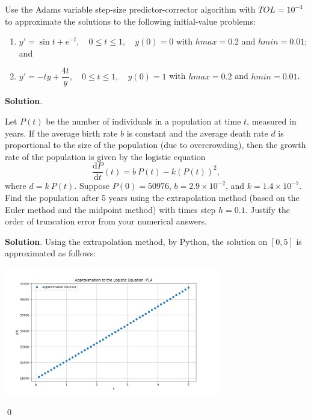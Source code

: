 \documentclass[11pt]{article}
\theoremstyle{break}
\newcommand{\dd}{\text{d}}
\numberwithin{equation}{theorem}
\begin{document}
\newpage
\begin{problem}\label{problem 13} %
    Use the Adams variable step-size predictor-corrector algorithm with $TOL = 10^{-4}$ to approximate the solutions to the following initial-value problems:
    \begin{enumerate}
        \item $y'=\sin t+e^{-t}, \quad 0\leq t\leq 1, \quad y(0)=0$ with $hmax=0.2$ and $hmin=0.01$; and
        \item $y'=-ty+\dfrac{4t}{y}, \quad 0\leq t\leq 1, \quad y(0)=1$ with $hmax=0.2$ and $hmin=0.01$.
    \end{enumerate}
\end{problem}
\textbf{Solution}. 


\newpage
\begin{problem}\label{problem 14} %
    Let $P(t)$ be the number of individuals in a population at time $t$, measured in years. If the average birth rate $b$ is constant and the average death rate $d$ is proportional to the size of the population (due to overcrowding), then the growth rate of the population is given by the logistic equation $$\dfrac{\dd P}{\dd t}(t)=b\:P(t)-k(P(t))^2,$$ where $d=k\:P(t)$. Suppose $P(0)=50976$, $b=2.9\times10^{-2}$, and $k=1.4\times 10^{-7}$. Find the population after 5 years using the extrapolation method (based on the Euler method and the midpoint method) with times step $h=0.1$. Justify the order of truncation error from your numerical answers.
\end{problem}
\textbf{Solution}. Using the extrapolation method, by Python, the solution on $[0, 5]$ is approximated as follows:

\begin{center}
    \includegraphics[width=0.7\textwidth]{P14.png}
\end{center} \qed
\end{document}
